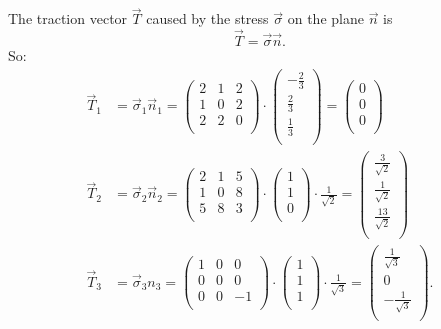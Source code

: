   \begin{derivation}
    The traction vector $\Vec{T}$ caused by the stress $\Vec{\sigma}$ on the plane $\Vec{n}$ is
    \begin{equation*}
      \Vec{T} = \Vec{\sigma} \Vec{n}
    .\end{equation*}
    So:
    \begin{align*}
      \Vec{T}_1 &= \Vec{\sigma}_1 \Vec{n}_1 = \begin{pmatrix}
        2 & 1 & 2\\
      1 & 0 & 2\\
      2 & 2 & 0\\
      \end{pmatrix} \cdot \begin{pmatrix}
        - \frac{2}{3}\\
      \frac{2}{3}\\
      \frac{1}{3}\\
      \end{pmatrix} = \left(
\begin{array}{c}
 0 \\
 0 \\
 0 \\
\end{array}
\right) \\
\Vec{T}_2 &= \Vec{\sigma}_2 \Vec{n}_2 = \begin{pmatrix}
  2 & 1 & 5\\
1 & 0 & 8\\
5 & 8 & 3\\
\end{pmatrix} \cdot \begin{pmatrix}
  1\\
1\\
0\\
\end{pmatrix} \cdot \frac{1}{\sqrt{2}} = \left(
\begin{array}{c}
 \frac{3}{\sqrt{2}} \\
 \frac{1}{\sqrt{2}} \\
 \frac{13}{\sqrt{2}} \\
\end{array}
\right) \\
\Vec{T}_3 &= \Vec{\sigma}_3 n_3 = \begin{pmatrix}
  1 & 0 & 0\\
0 & 0 & 0\\
0 & 0 & -1\\
\end{pmatrix} \cdot \begin{pmatrix}
  1\\
1\\
1\\
\end{pmatrix} \cdot \frac{1}{\sqrt{3}} = \left(
\begin{array}{c}
 \frac{1}{\sqrt{3}} \\
 0 \\
 -\frac{1}{\sqrt{3}} \\
\end{array}
\right)
    .\end{align*}
  \end{derivation}

